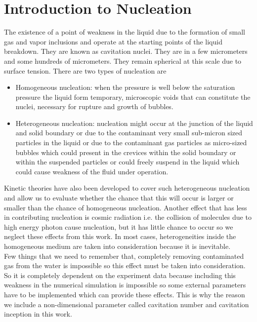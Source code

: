 \section{Introduction to Nucleation}
The existence of a point of weakness in the liquid due to the
formation of small gas and vapor inclusions and operate at the
starting points of the liquid breakdown. They are known as cavitation
nuclei. They are in a few micrometers and some hundreds of
micrometers. They remain spherical at this scale due to surface
tension. There are two types of nucleation are

\begin{itemize}
\item Homogeneous nucleation: when the pressure is well below the
  saturation pressure the liquid form temporary, microscopic voids
  that can constitute the nuclei, necessary for rupture and growth of
  bubbles.
\item Heterogeneous nucleation: nucleation might occur at the junction
  of the liquid and solid boundary or due to the contaminant very
  small sub-micron sized particles in the liquid or due to the
  contaminant gas particles as micro-sized bubbles which could present
  in the crevices within the solid boundary or within the suspended
  particles or could freely suspend in the liquid which could cause
  weakness of the fluid under operation.
\end{itemize}

Kinetic theories have also been developed to cover such heterogeneous
nucleation and allow us to evaluate whether the chance that this will
occur is larger or smaller than the chance of homogeneous nucleation.
Another effect that has less in contributing nucleation is cosmic
radiation i.e. the collision of molecules due to high energy photon
cause nucleation, but it has little chance to occur so we neglect
these effects from this work. In most cases, heterogeneities inside
the homogeneous medium are taken into consideration because it is
inevitable.\\ Few things that we need to remember that, completely
removing contaminated gas from the water is impossible so this effect
must be taken into consideration. So it is completely dependent on the
experiment data because including this weakness in the numerical
simulation is impossible so some external parameters have to be
implemented which can provide these effects. This is why the reason we
include a non-dimensional parameter called cavitation number and
cavitation inception in this work.\\

